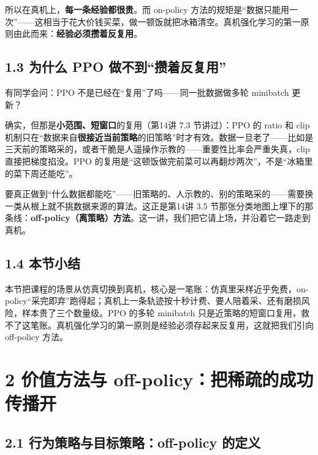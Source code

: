 \documentclass[
  chinese,
]{ctexart}
\begin{document}
所以在真机上，\textbf{每一条经验都很贵}。而 on-policy
方法的规矩是``数据只能用一次''------这相当于花大价钱买菜，做一顿饭就把冰箱清空。真机强化学习的第一原则由此而来：\textbf{经验必须攒着反复用}。

\subsection{1.3 为什么 PPO
做不到``攒着反复用''}\label{ux4e3aux4ec0ux4e48-ppo-ux505aux4e0dux5230ux6512ux7740ux53cdux590dux7528}

有同学会问：PPO 不是已经在``复用''了吗------同一批数据做多轮 minibatch
更新？

确实，但那是\textbf{小范围、短窗口}的复用（第14讲 7.3 节讲过）：PPO 的
ratio 和 clip
机制只在``数据来自\textbf{很接近当前策略}的旧策略''时才有效。数据一旦老了------比如是三天前的策略采的，或者干脆是人遥操作示教的------重要性比率会严重失真，clip
直接把梯度掐没。PPO
的复用是``这顿饭做完前菜可以再翻炒两次''，不是``冰箱里的菜下周还能吃''。

要真正做到``什么数据都能吃''------旧策略的、人示教的、别的策略采的------需要换一类从根上就不挑数据来源的算法。这正是第14讲
3.5
节那张分类地图上埋下的那条线：\textbf{off-policy（离策略）方法}。这一讲，我们把它请上场，并沿着它一路走到真机。

\subsection{1.4 本节小结}\label{ux672cux8282ux5c0fux7ed3}

本节把课程的场景从仿真切换到真机，核心是一笔账：仿真里采样近乎免费，on-policy``采完即弃''跑得起；真机上一条轨迹按十秒计费、要人陪着采、还有磨损风险，样本贵了三个数量级。PPO
的多轮 minibatch
只是近策略的短窗口复用，救不了这笔账。真机强化学习的第一原则是经验必须存起来反复用，这就把我们引向
off-policy 方法。

\section{2 价值方法与
off-policy：把稀疏的成功传播开}\label{ux4ef7ux503cux65b9ux6cd5ux4e0e-off-policyux628aux7a00ux758fux7684ux6210ux529fux4f20ux64adux5f00}

\subsection{2.1 行为策略与目标策略：off-policy
的定义}\label{ux884cux4e3aux7b56ux7565ux4e0eux76eeux6807ux7b56ux7565off-policy-ux7684ux5b9aux4e49}
\end{document}
